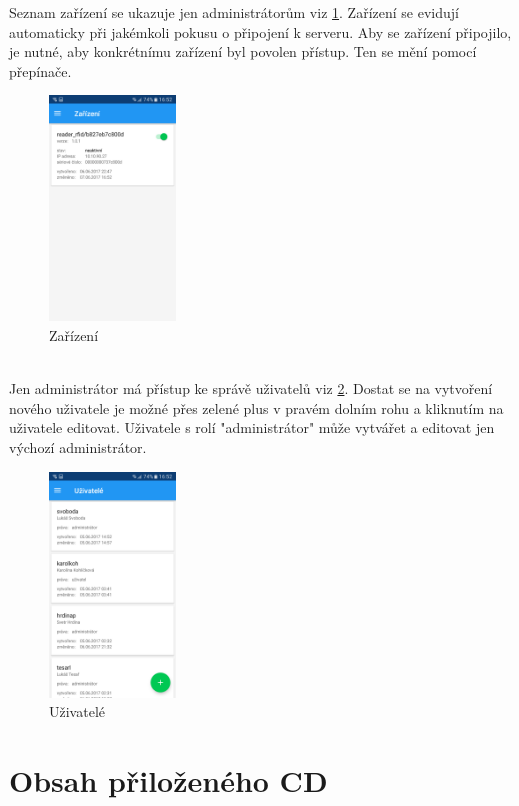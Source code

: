 \documentclass[czech,BP]{thesiskiv}
\begin{document}
Seznam zařízení se ukazuje jen administrátorům viz \ref{fig:Screenshot_20170607-165221}. Zařízení se evidují automaticky při jakémkoli pokusu o připojení k serveru. Aby se zařízení připojilo, je nutné, aby konkrétnímu zařízení byl povolen přístup. Ten se mění pomocí přepínače.

\begin{figure}[h]
	\centering
	\includegraphics[width=0.3\textwidth]{../images/client_android/Screenshot_20170607-165221.png}	
	\caption{Zařízení}
	\label{fig:Screenshot_20170607-165221}
\end{figure}
\ \\
Jen administrátor má přístup ke správě uživatelů viz \ref{fig:Screenshot_20170607-165248}.
Dostat se na vytvoření nového uživatele je možné přes zelené plus v pravém dolním rohu a kliknutím na uživatele editovat.
Uživatele s rolí "administrátor" může vytvářet a editovat jen výchozí administrátor.

\begin{figure}[h]
	\centering
	\includegraphics[width=0.3\textwidth]{../images/client_android/Screenshot_20170607-165248.png}	
	\caption{Uživatelé}
	\label{fig:Screenshot_20170607-165248}
\end{figure}


	
	

\chapter{Obsah přiloženého CD}
\end{document}
